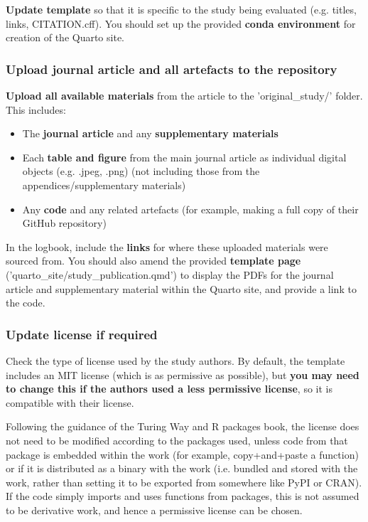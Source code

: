 \textbf{Update template} so that it is specific to the study being evaluated (e.g. titles, links, CITATION.cff). You should set up the provided \textbf{conda environment} for creation of the Quarto site.

\vspace{0.5cm}
\subsubsection{Upload journal article and all artefacts to the repository}

 \textbf{Upload all available materials} from the article to the 'original\_study/' folder. This includes:
\begin{itemize}
    \item The \textbf{journal article} and any \textbf{supplementary materials}
    \item Each \textbf{table and figure} from the main journal article as individual digital objects (e.g. .jpeg, .png) (not including those from the appendices/supplementary materials)
    \item Any \textbf{code} and any related artefacts (for example, making a full copy of their GitHub repository)
\end{itemize}

In the logbook, include the \textbf{links} for where these uploaded materials were sourced from. You should also amend the provided \textbf{template page} ('quarto\_site/study\_publication.qmd') to display the PDFs for the journal article and supplementary material within the Quarto site, and provide a link to the code.

\subsubsection{Update license if required}

Check the type of license used by the study authors. By default, the template includes an MIT license (which is as permissive as possible), but \textbf{you may need to change this if the authors used a less permissive license}, so it is compatible with their license.

Following the guidance of the Turing Way\autocite{the_turing_way_community_turing_2022} and R packages book,\autocite{wickham_12_2023} the license does not need to be modified according to the packages used, unless code from that package is embedded within the work (for example, copy+and+paste a function) or if it is distributed as a binary with the work (i.e. bundled and stored with the work, rather than setting it to be exported from somewhere like PyPI or CRAN). If the code simply imports and uses functions from packages, this is not assumed to be derivative work, and hence a permissive license can be chosen.

